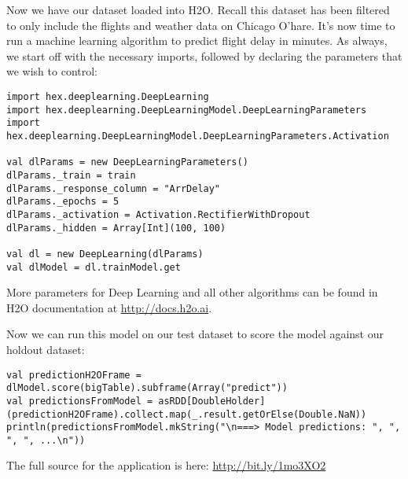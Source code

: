 Now we have our dataset loaded into H2O. Recall this dataset has been filtered to only include the flights and weather data on Chicago O'hare. It's now time to run a machine learning algorithm to predict flight delay in minutes. As always, we start off with the necessary imports, followed by declaring the parameters that we wish to control:
\pagebreak
\begin{lstlisting}[style=Scala]
import hex.deeplearning.DeepLearning
import hex.deeplearning.DeepLearningModel.DeepLearningParameters
import hex.deeplearning.DeepLearningModel.DeepLearningParameters.Activation

val dlParams = new DeepLearningParameters()
dlParams._train = train
dlParams._response_column = "ArrDelay"
dlParams._epochs = 5
dlParams._activation = Activation.RectifierWithDropout
dlParams._hidden = Array[Int](100, 100)

val dl = new DeepLearning(dlParams)
val dlModel = dl.trainModel.get
\end{lstlisting}

More parameters for Deep Learning and all other algorithms can be found in H2O documentation at \url{http://docs.h2o.ai}.

Now we can run this model on our test dataset to score the model against our holdout dataset:
\begin{lstlisting}[style=Scala]
val predictionH2OFrame = dlModel.score(bigTable).subframe(Array("predict"))
val predictionsFromModel = asRDD[DoubleHolder](predictionH2OFrame).collect.map(_.result.getOrElse(Double.NaN))
println(predictionsFromModel.mkString("\n===> Model predictions: ", ", ", ", ...\n"))
\end{lstlisting}

The full source for the application is here: \url{http://bit.ly/1mo3XO2}

